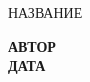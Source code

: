 
\begin{center}
    \LARGE НАЗВАНИЕ
\end{center}
\begin{flushright}
    \textbf{АВТОР} \\
    \textbf{ДАТА}
\end{flushright}

